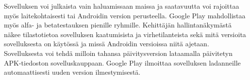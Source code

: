 Sovelluksen voi julkaista vain haluamissaan maissa ja saatavuutta voi rajoittaa myös laitekohtaisesti tai Androidin version perusteella. Google Play mahdollistaa myös alfa- ja betatestauksen pienille ryhmille. Kehittäjän hallintanäkymästä näkee tilastotietoa sovelluksen kaatumisista ja virhetilanteista sekä mitä versioita sovelluksesta on käytössä ja missä Androidin versioissa niitä ajetaan. Sovelluksesta voi tehdä milloin tahansa päivitysversion lataamalla päivitetyn APK-tiedoston sovelluskauppaan. Google Play ilmoittaa sovelluksen ladanneille automaattisesti uuden version ilmestymisestä.
